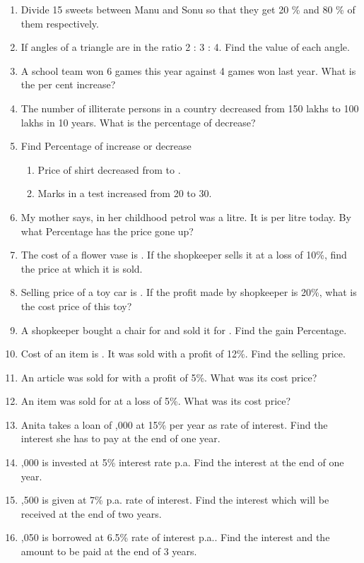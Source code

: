\begin{enumerate}[label=\thesubsection.\arabic*,ref=\thesubsection.\theenumi,resume*]
\item 	Divide 15 sweets between Manu and Sonu so that they get 20 \% and 80 \% of them respectively.
\item If angles of a triangle are in the ratio 2 : 3 : 4. Find the value of each angle.
\item A school team won 6 games this year against 4 games won last year. What is the per cent increase?
\item The number of illiterate persons in a country decreased from 150 lakhs to 100 lakhs in 10 years. What is the percentage of decrease?
\item Find Percentage of increase or decrease
	\begin{enumerate}
	\item  Price of shirt decreased from  to .
	\item Marks in a test increased from 20 to 30.
	\end{enumerate}
\item  My mother says, in her childhood petrol was  a litre. It is  per litre today. By what Percentage has the price gone up?
\item The cost of a flower vase is . If the shopkeeper sells it at a loss of 10\%, find the price at which it is sold.
\item Selling price of a toy car is . If the profit made by shopkeeper is 20\%, what is the cost price of this toy?
\item A shopkeeper bought a chair for  and sold it for . Find the gain Percentage. 
\item  Cost of an item is . It was sold with a profit of 12\%. Find the selling price. 
\item  An article was sold for  with a profit of 5\%. What was its cost price? 
\item  An item was sold for  at a loss of 5\%. What was its cost price?
\item Anita takes a loan of ,000 at 15\% per year as rate of interest. Find the interest she has to pay at the end of one year.
\item {},000 is invested at 5\% interest rate p.a. Find the interest at the end of one year.
\item  {},500 is given at 7\% p.a. rate of interest. Find the interest which will be received at the end of two years.
\item  {},050 is borrowed at 6.5\% rate of interest p.a.. Find the interest and the amount to be paid at the end of 3 years.

\end{enumerate}
